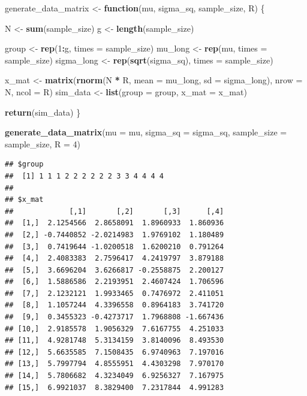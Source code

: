 \documentclass[
]{book}
\newenvironment{Shaded}{\begin{snugshade}}{\end{snugshade}}
\newcommand{\AttributeTok}[1]{\textcolor[rgb]{0.13,0.29,0.53}{#1}}
\newcommand{\ControlFlowTok}[1]{\textcolor[rgb]{0.13,0.29,0.53}{\textbf{#1}}}
\newcommand{\DecValTok}[1]{\textcolor[rgb]{0.00,0.00,0.81}{#1}}
\newcommand{\FunctionTok}[1]{\textcolor[rgb]{0.13,0.29,0.53}{\textbf{#1}}}
\newcommand{\NormalTok}[1]{#1}
\newcommand{\OtherTok}[1]{\textcolor[rgb]{0.56,0.35,0.01}{#1}}
\newcommand{\SpecialCharTok}[1]{\textcolor[rgb]{0.81,0.36,0.00}{\textbf{#1}}}
\begin{document}
\begin{Shaded}
\begin{Highlighting}[]
\NormalTok{generate\_data\_matrix }\OtherTok{\textless{}{-}} \ControlFlowTok{function}\NormalTok{(mu, sigma\_sq, sample\_size, R) \{}

\NormalTok{  N }\OtherTok{\textless{}{-}} \FunctionTok{sum}\NormalTok{(sample\_size) }
\NormalTok{  g }\OtherTok{\textless{}{-}} \FunctionTok{length}\NormalTok{(sample\_size) }
  
\NormalTok{  group }\OtherTok{\textless{}{-}} \FunctionTok{rep}\NormalTok{(}\DecValTok{1}\SpecialCharTok{:}\NormalTok{g, }\AttributeTok{times =}\NormalTok{ sample\_size) }
\NormalTok{  mu\_long }\OtherTok{\textless{}{-}} \FunctionTok{rep}\NormalTok{(mu, }\AttributeTok{times =}\NormalTok{ sample\_size)}
\NormalTok{  sigma\_long }\OtherTok{\textless{}{-}} \FunctionTok{rep}\NormalTok{(}\FunctionTok{sqrt}\NormalTok{(sigma\_sq), }\AttributeTok{times =}\NormalTok{ sample\_size) }

\NormalTok{  x\_mat }\OtherTok{\textless{}{-}} \FunctionTok{matrix}\NormalTok{(}\FunctionTok{rnorm}\NormalTok{(N }\SpecialCharTok{*}\NormalTok{ R, }\AttributeTok{mean =}\NormalTok{ mu\_long, }\AttributeTok{sd =}\NormalTok{ sigma\_long),}
                  \AttributeTok{nrow =}\NormalTok{ N, }\AttributeTok{ncol =}\NormalTok{ R)}
\NormalTok{  sim\_data }\OtherTok{\textless{}{-}} \FunctionTok{list}\NormalTok{(}\AttributeTok{group =}\NormalTok{ group, }\AttributeTok{x\_mat =}\NormalTok{ x\_mat)}
    
  \FunctionTok{return}\NormalTok{(sim\_data)}
\NormalTok{\}}

\FunctionTok{generate\_data\_matrix}\NormalTok{(}\AttributeTok{mu =}\NormalTok{ mu, }\AttributeTok{sigma\_sq =}\NormalTok{ sigma\_sq,}
                     \AttributeTok{sample\_size =}\NormalTok{ sample\_size, }\AttributeTok{R =} \DecValTok{4}\NormalTok{)}
\end{Highlighting}
\end{Shaded}

\begin{verbatim}
## $group
##  [1] 1 1 1 2 2 2 2 2 2 3 3 4 4 4 4
## 
## $x_mat
##             [,1]       [,2]       [,3]      [,4]
##  [1,]  2.1254566  2.8658091  1.8960933  1.860936
##  [2,] -0.7440852 -2.0214983  1.9769102  1.180489
##  [3,]  0.7419644 -1.0200518  1.6200210  0.791264
##  [4,]  2.4083383  2.7596417  4.2419797  3.879188
##  [5,]  3.6696204  3.6266817 -0.2558875  2.200127
##  [6,]  1.5886586  2.2193951  2.4607424  1.706596
##  [7,]  2.1232121  1.9933465  0.7476972  2.411051
##  [8,]  1.1057244  4.3396558  0.8964183  3.741720
##  [9,]  0.3455323 -0.4273717  1.7968808 -1.667436
## [10,]  2.9185578  1.9056329  7.6167755  4.251033
## [11,]  4.9281748  5.3134159  3.8140096  8.493530
## [12,]  5.6635585  7.1508435  6.9740963  7.197016
## [13,]  5.7997794  4.8555951  4.4303298  7.970170
## [14,]  5.7806682  4.3234049  6.9256327  7.167975
## [15,]  6.9921037  8.3829400  7.2317844  4.991283
\end{verbatim}
\end{document}
